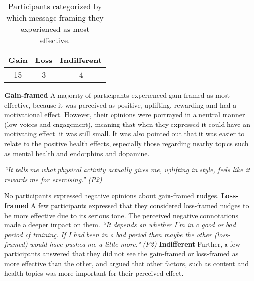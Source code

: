 \begin{table}[ht]
\begin{center}
\begin{tabular}{|c|c|c|}
\hline
\textbf{Gain} & \textbf{Loss} & \textbf{Indifferent} \\ \hline
15 & 3 & 4 \\ \hline
\end{tabular}
\caption{\label{tab:table-name} Participants categorized by which message framing they experienced as most effective.}
\end{center}
\end{table}

\bigbreak
\textbf{Gain-framed}
\bigbreak
A majority of participants experienced gain framed as most effective, because it was perceived as positive, uplifting, rewarding and had a motivational effect. However, their opinions were portrayed in a neutral manner (low voices and engagement), meaning that when they expressed it could have an motivating effect, it was still small. It was also pointed out that it was easier to relate to the positive health effects, especially those regarding nearby topics such as mental health and endorphins and dopamine. 

\textit{“It tells me what physical activity actually gives me, uplifting in style, feels like it rewards me for exercising.” (P2)}

 No participants expressed negative opinions about gain-framed nudges.
\bigbreak
\textbf{Loss-framed}
\bigbreak
A few participants expressed that they considered loss-framed nudges to be more effective due to its serious tone. The perceived negative connotations made a deeper impact on them. \textit{“It depends on whether I'm in a good or bad period of training. If I had been in a bad period then maybe the other (loss-framed) would have pushed me a little more." (P2)}
\bigbreak
\textbf{Indifferent}
\bigbreak
Further, a few participants answered that they did not see the gain-framed or loss-framed as more effective than  the other, and argued that other factors, such as content and health topics was more important for their perceived effect. 



